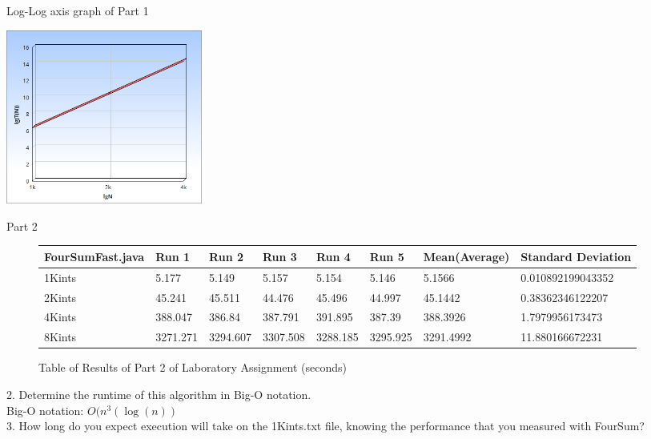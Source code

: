 \documentclass{article}
\begin{document}
\begin{center}
Log-Log axis graph of Part 1
\end{center}
\begin{center}
\includegraphics[width=6.45cm]{Part1Log.png}
\end{center}
\newpage
\begin{center}
\Huge Part 2
\end{center}
\begin{figure}[H]
\begin{adjustwidth}{-3cm}{}
\begin{tabular}{| l | l | l | l | l | l | l | l |}
\hline
FourSumFast.java & Run 1 & Run 2 & Run 3 & Run 4 & Run 5 & Mean(Average) & Standard Deviation \\ \hline
1Kints & 5.177 & 5.149 & 5.157 & 5.154 & 5.146 & 5.1566 & 0.010892199043352 
\\ \hline

2Kints & 45.241 & 45.511 & 44.476 & 45.496 & 44.997 & 45.1442 & 0.38362346122207
\\ \hline

4Kints & 388.047 & 386.84 & 387.791 & 391.895 & 387.39 & 388.3926 & 1.7979956173473
\\ \hline

8Kints & 3271.271 & 3294.607 & 3307.508 & 3288.185 & 3295.925 & 3291.4992 & 11.880166672231
\\ \hline
\end{tabular}
\caption{Table of Results of Part 2 of Laboratory Assignment (seconds)}
\end{adjustwidth}
\end{figure}
2. Determine the runtime of this algorithm in Big-O notation.
\\
Big-O notation: $O(n^3 (\log (n))$
\\
3. How long do you expect execution will take on the 1Kints.txt file, knowing the performance that you measured with FourSum?
\\
\end{document}
